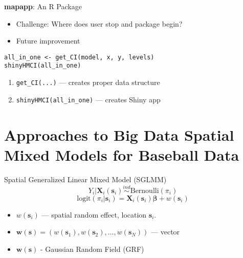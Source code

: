 \documentclass{beamer}
\begin{document}
\begin{frame}[fragile]{{\bf mapapp}: An R Package}
\begin{itemize}
\addtolength{\itemsep}{0.5\baselineskip}
\item Challenge: Where does user stop and package begin?
\item Future improvement
\end{itemize}

\begin{verbatim}
all_in_one <- get_CI(model, x, y, levels)
shinyHMCI(all_in_one)
\end{verbatim}

\begin{enumerate}
\addtolength{\itemsep}{0.5\baselineskip}
\item \verb|get_CI(...)| --- creates proper data structure 
\item \verb|shinyHMCI(all_in_one)| --- creates Shiny app
\end{enumerate}

\end{frame}

\section{Approaches to Big Data Spatial Mixed Models for Baseball Data}

\begin{frame}{Spatial Generalized Linear Mixed Model (SGLMM)}{}
$$ Y_{i}|\mathbf{X}_{i}(\mathbf{s}_{i}) \stackrel{ind}{\sim} \mbox{Bernoulli}(\pi_{i}) $$
$$\text{logit}(\pi_{i}|\pmb{s}_{i}) = \mathbf{X}_{i}(\mathbf{s}_{i})\pmb{\beta} + w(\pmb{s}_{i}) $$
\begin{itemize}
\addtolength{\itemsep}{0.5\baselineskip}
\item $w(\pmb{s}_{i})$ --- spatial random effect, location $\pmb{s}_{i}$.
\item $\pmb{w}(\pmb{s}) = (w(\pmb{s}_{1}), w(\pmb{s}_{2}), \dots, w(\pmb{s}_{N}))$ --- vector
\item $\pmb{w}(\pmb{s})$ - Gaussian Random Field (GRF)
\end{itemize}

\end{frame}
\end{document}
